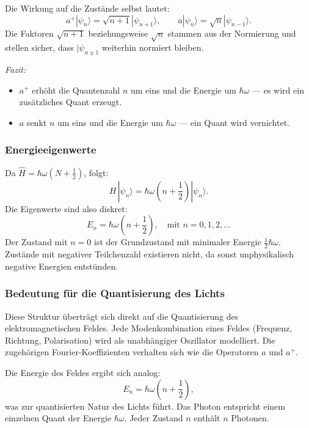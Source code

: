 			Die Wirkung auf die Zustände selbst lautet:
			\begin{equation}
				a^+|\psi_n\rangle = \sqrt{n+1}|\psi_{n+1}\rangle, \qquad a|\psi_n\rangle = \sqrt{n}|\psi_{n-1}\rangle.
			\end{equation}
			Die Faktoren $\sqrt{n+1}$ beziehungsweise $\sqrt{n}$ stammen aus der Normierung und stellen sicher, dass $|\psi_{n\pm 1}$ weiterhin normiert bleiben.

			\emph{Fazit:}
			\begin{itemize}
				\item $a^+$ erhöht die Quantenzahl $n$ um eins und die Energie um $\hbar\omega$ ---
				es wird ein zusätzliches Quant erzeugt.
				\item $a$ senkt $n$ um eins und die Energie um $\hbar\omega$ ---
				ein Quant wird vernichtet.
			\end{itemize}

		\subsubsection{Energieeigenwerte\label{fourier:subsubsection:Energieeigenwerte}}
			Da $\hat{H} = \hbar\omega(N + \frac{1}{2})$, folgt:
			\begin{equation}
				H\,|\psi_n\rangle = \hbar\omega\left(n + \frac{1}{2}\right) |\psi_n\rangle.
			\end{equation}
			Die Eigenwerte sind also diskret:
			\[
				E_n = \hbar\omega\left(n + \frac{1}{2}\right), \quad \text{mit } n = 0,1,2,\dots
			\]
			Der Zustand mit $n = 0$ ist der Grundzustand mit minimaler Energie $\frac{1}{2}\hbar\omega$.
			Zustände mit negativer Teilchenzahl existieren nicht, da sonst unphysikalisch negative Energien entstünden.

		\subsubsection{Bedeutung für die Quantisierung des Lichts\label{fourier:subsubsection:QuantisierungElmagFeld}}
			Diese Struktur überträgt sich direkt auf die Quantisierung des elektromagnetischen Feldes.
			Jede Modenkombination eines Feldes (Frequenz, Richtung, Polarisation) wird als unabhängiger Oszillator modelliert.
			Die zugehörigen Fourier-Koeffizienten verhalten sich wie die Operatoren $a$ und $a^+$.

			Die Energie des Feldes ergibt sich analog:
			\[
				E_n = \hbar\omega\left(n + \frac{1}{2}\right),
			\]
			was zur quantisierten Natur des Lichts  führt.
			Das Photon entspricht einem einzelnen Quant der Energie $\hbar\omega$.
			Jeder Zustand $n$ enthält $n$ Photonen.
			
